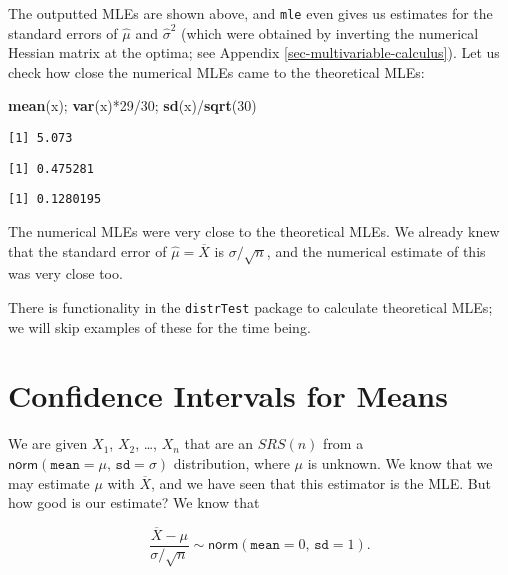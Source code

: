 \documentclass[]{book}
\newenvironment{Shaded}{\begin{snugshade}}{\end{snugshade}}
\newcommand{\KeywordTok}[1]{\textcolor[rgb]{0.13,0.29,0.53}{\textbf{{#1}}}}
\newcommand{\DecValTok}[1]{\textcolor[rgb]{0.00,0.00,0.81}{{#1}}}
\newcommand{\NormalTok}[1]{{#1}}
\numberwithin{equation}{chapter}
\numberwithin{figure}{chapter}
\theoremstyle{plain}
\theoremstyle{definition}
\theoremstyle{remark}
\theoremstyle{definition}
\theoremstyle{definition}
\theoremstyle{remark}
\begin{document}
The outputted MLEs are shown above, and \texttt{mle} even gives us
estimates for the standard errors of \(\hat{\mu}\) and
\(\hat{\sigma}^{2}\) (which were obtained by inverting the numerical
Hessian matrix at the optima; see Appendix
\ref{sec-multivariable-calculus}). Let us check how close the numerical
MLEs came to the theoretical MLEs:

\begin{Shaded}
\begin{Highlighting}[]
\KeywordTok{mean}\NormalTok{(x); }\KeywordTok{var}\NormalTok{(x)*}\DecValTok{29}\NormalTok{/}\DecValTok{30}\NormalTok{; }\KeywordTok{sd}\NormalTok{(x)/}\KeywordTok{sqrt}\NormalTok{(}\DecValTok{30}\NormalTok{)}
\end{Highlighting}
\end{Shaded}

\begin{verbatim}
[1] 5.073
\end{verbatim}

\begin{verbatim}
[1] 0.475281
\end{verbatim}

\begin{verbatim}
[1] 0.1280195
\end{verbatim}

The numerical MLEs were very close to the theoretical MLEs. We already
knew that the standard error of \(\hat{\mu}=\overline{X}\) is
\(\sigma/\sqrt{n}\), and the numerical estimate of this was very close
too.

There is functionality in the \texttt{distrTest} package
\autocite{distrTest} to calculate theoretical MLEs; we will skip
examples of these for the time being.

\section{Confidence Intervals for
Means}\label{sec-confidence-intervals-for-means}

We are given \(X_{1}\), \(X_{2}\), \ldots{}, \(X_{n}\) that are an
\(SRS(n)\) from a
\(\mathsf{norm}(\mathtt{mean}=\mu,\,\mathtt{sd}=\sigma)\) distribution,
where \(\mu\) is unknown. We know that we may estimate \(\mu\) with
\(\overline{X}\), and we have seen that this estimator is the MLE. But
how good is our estimate? We know that

\begin{equation} 
\frac{\overline{X}-\mu}{\sigma/\sqrt{n}}\sim\mathsf{norm}(\mathtt{mean}=0,\,\mathtt{sd}=1).
\end{equation}
\end{document}
